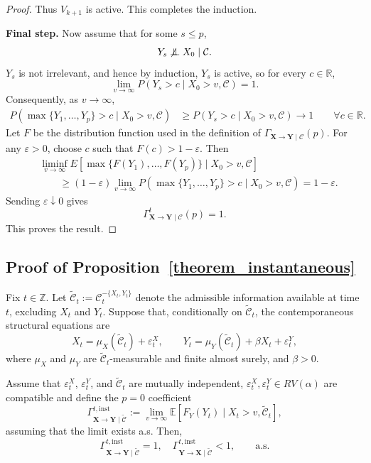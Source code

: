 \documentclass[a4paper,11pt]{article}
\newenvironment{customprop}[1]
  {\renewcommand\theinnercustomprop{#1}\innercustomprop}
  {\endinnercustomprop}
\newcommand{\indep}{\perp\kern-5.5pt\perp}
\begin{document}
\begin{proof}
Thus \(V_{k+1}\) is active. This completes the induction.

\textbf{Final step.} Now assume that for some \(s\le p\),
\[
   Y_s\not\indep X_0\mid\mathcal C .
\]
\(Y_s\) is not irrelevant, and hence by induction, \(Y_s\) is active, so for every \(c\in\mathbb R\),
\[
   \lim_{v\to\infty}
   P(Y_s>c\mid X_0>v,\mathcal C)=1 .
\]
Consequently, as $v\to\infty$,
\[
\begin{split}
   P\!\left(
      \max\{Y_1,\ldots,Y_p\}>c
      \mid X_0>v,\mathcal C
   \right)
   &\ge
   P(Y_s>c\mid X_0>v,\mathcal C)\to 1
   \qquad
   \forall c\in\mathbb R .
\end{split}
\]
Let \(F\) be the distribution function used in the definition of
\(\Gamma_{\mathbf X\to\mathbf Y\mid\mathcal C}(p)\). For any
\(\varepsilon>0\), choose \(c\) such that \(F(c)>1-\varepsilon\). Then
\[
\begin{split}
&\liminf_{v\to\infty}
E\!\left[
   \max\{F(Y_1),\ldots,F(Y_p)\}
   \mid X_0>v,\mathcal C
\right]  \\
&\qquad\ge
(1-\varepsilon)
\lim_{v\to\infty}
P\!\left(
   \max\{Y_1,\ldots,Y_p\}>c
   \mid X_0>v,\mathcal C
\right)
=1-\varepsilon .
\end{split}
\]
Sending \(\varepsilon\downarrow0\) gives
\[
   \Gamma_{\mathbf X\to\mathbf Y\mid\mathcal C}^t(p)=1 .
\]
This proves the result.
\end{proof}





\newpage
\subsection{Proof of Proposition~\ref{theorem_instantaneous}}
\label{section_proof_instantaneous}

\begin{customprop}{\ref{theorem_instantaneous}}
Fix \(t\in\mathbb Z\). Let \(
\tilde{\mathcal C}_t:=\mathcal C_t^{-\{X_t,Y_t\}}
\) denote the admissible information available at time \(t\), excluding \(X_t\) and \(Y_t\).
Suppose that, conditionally on \(\tilde{\mathcal C}_t\), the contemporaneous structural equations are
\[
X_t=\mu_X(\tilde{\mathcal C}_t)+\varepsilon_t^X,
\qquad
Y_t=\mu_Y(\tilde{\mathcal C}_t)+\beta X_t+\varepsilon_t^Y,
\]
where \(\mu_X\) and \(\mu_Y\) are \(\tilde{\mathcal C}_t\)-measurable and finite almost surely, and $\beta>0$. 

Assume that \(\varepsilon_t^X\), \(\varepsilon_t^Y\), and \(\tilde{\mathcal C}_t\) are mutually independent,  \(\varepsilon_t^X, \varepsilon_t^Y\in RV(\alpha)\) are compatible and define the $p=0$ coefficient 
\[
\Gamma^{t,\mathrm{inst}}_{\mathbf X\to\mathbf Y\mid\tilde{\mathcal C}}
:=
\lim_{v\to\infty}
\mathbb E\!\left[
F_Y(Y_t)\mid X_t>v,\tilde{\mathcal C}_t
\right],
\]
assuming that the limit exists a.s. Then,
\[
\Gamma^{t,\mathrm{inst}}_{\mathbf X\to\mathbf Y\mid\tilde{\mathcal C}}=1, \quad \Gamma^{t,\mathrm{inst}}_{\mathbf Y\to\mathbf X\mid\tilde{\mathcal C}}<1,
\quad
\quad\text{a.s.}
\]
\end{customprop}
\end{document}

